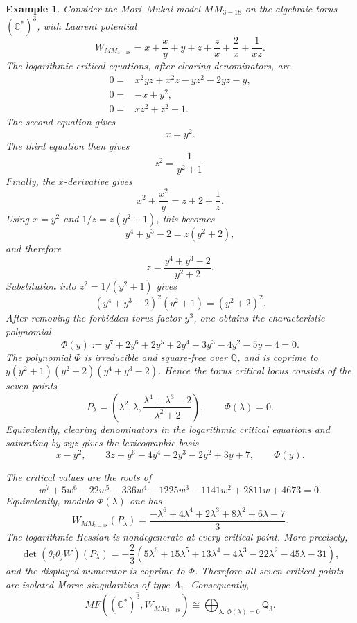 \documentclass[11pt]{amsart}
\newtheorem{example}{Example}[section]
\newcommand{\MorseCat}[1]{\mathsf{Q}_{#1}}
\begin{document}
\begin{example}
Consider the Mori--Mukai model $MM_{3-18}$ on the algebraic torus
$(\mathbb{C}^*)^3$, with Laurent potential
\[
W_{MM_{3-18}}=x+\frac{x}{y}+y+z+\frac{z}{x}+\frac{2}{x}
+\frac{1}{xz}.
\]
The logarithmic critical equations, after clearing denominators, are
\begin{align*}
0={}&x^2yz+x^2z-yz^2-2yz-y, \\
0={}&-x+y^2, \\
0={}&xz^2+z^2-1.
\end{align*}
The second equation gives
\[
x=y^2.
\]
The third equation then gives
\[
z^2=\frac{1}{y^2+1}.
\]
Finally, the $x$-derivative gives
\[
x^2+\frac{x^2}{y}=z+2+\frac{1}{z}.
\]
Using $x=y^2$ and $1/z=z(y^2+1)$, this becomes
\[
y^4+y^3-2=z(y^2+2),
\]
and therefore
\[
z=\frac{y^4+y^3-2}{y^2+2}.
\]
Substitution into $z^2=1/(y^2+1)$ gives
\[
(y^4+y^3-2)^2(y^2+1)=(y^2+2)^2.
\]
After removing the forbidden torus factor $y^3$, one obtains the characteristic
polynomial
\[
\Phi(y):=y^7+2y^6+2y^5+2y^4-3y^3-4y^2-5y-4=0.
\]
The polynomial $\Phi$ is irreducible and square-free over $\mathbb{Q}$, and is
coprime to $y(y^2+1)(y^2+2)(y^4+y^3-2)$. Hence the torus critical locus consists
of the seven points
\[
P_\lambda=\left(\lambda^2,\lambda,
\frac{\lambda^4+\lambda^3-2}{\lambda^2+2}\right),
\qquad
\Phi(\lambda)=0.
\]
Equivalently, clearing denominators in the logarithmic critical equations and
saturating by $xyz$ gives the lexicographic basis
\[
x-y^2,
\qquad
3z+y^6-4y^4-2y^3-2y^2+3y+7,
\qquad
\Phi(y).
\]

The critical values are the roots of
\[
w^7+5w^6-22w^5-336w^4-1225w^3-1141w^2+2811w+4673=0.
\]
Equivalently, modulo $\Phi(\lambda)$ one has
\[
W_{MM_{3-18}}(P_\lambda)=
\frac{-\lambda^6+4\lambda^4+2\lambda^3+8\lambda^2+6\lambda-7}{3}.
\]
The logarithmic Hessian is nondegenerate at every critical point. More
precisely,
\[
\det(\theta_i\theta_jW)(P_\lambda)
=-\frac{2}{3}(5\lambda^6+15\lambda^5+13\lambda^4-4\lambda^3
-22\lambda^2-45\lambda-31),
\]
and the displayed numerator is coprime to $\Phi$. Therefore all seven critical
points are isolated Morse singularities of type $A_1$. Consequently,
\[
\overline{MF((\mathbb{C}^*)^3,W_{MM_{3-18}})}
\cong \bigoplus_{\lambda:\,\Phi(\lambda)=0}\MorseCat{3}.
\]
\end{example}
\end{document}
